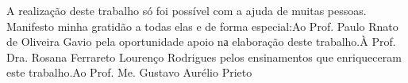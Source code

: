 \begin{agradecimentos}
	A realização deste trabalho só foi possível com a ajuda de muitas pessoas. Manifesto minha gratidão a todas elas e de forma especial:\newline Ao Prof. Paulo Rnato de Oliveira Gavio pela oportunidade  apoio nа elaboração deste trabalho.\newline À Prof. Dra. Rosana Ferrareto Lourenço Rodrigues pelos ensinamentos que enriqueceram este trabalho.\newline Ao Prof. Me. Gustavo Aurélio Prieto
\end{agradecimentos}